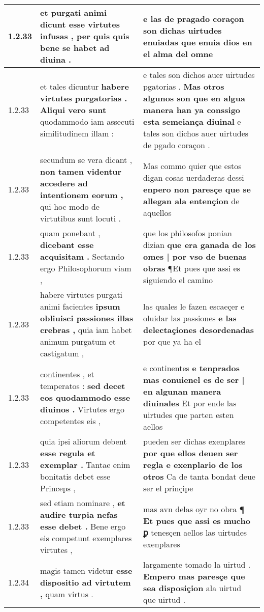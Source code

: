 \begin{tabular}{|p{1cm}|p{6.5cm}|p{6.5cm}|}
1.2.33 & et purgati animi dicunt \textbf{ esse virtutes infusas , } per quis quis bene se habet ad diuina . & e las de pragado coraçon \textbf{ son dichas uirtudes enuiadas } que enuia dios en el alma del omne \\\hline
1.2.33 & et tales dicuntur \textbf{ habere virtutes purgatorias . Aliqui vero sunt } quodammodo iam assecuti similitudinem illam : & e tales son dichos auer uirtudes pgatorias . \textbf{ Mas otros algunos son que en algua manera han ya conssigo esta semeiança diuinal } e tales son dichos auer uirtudes de pgado coraçon . \\\hline
1.2.33 & secundum se vera dicant , \textbf{ non tamen videntur accedere ad intentionem eorum , } qui hoc modo de virtutibus sunt locuti . & Mas commo quier que estos digan cosas uerdaderas dessi \textbf{ enpero non paresçe que se allegan ala entençion } de aquellos \\\hline
1.2.33 & quam ponebant , \textbf{ dicebant esse acquisitam . } Sectando ergo Philosophorum viam , & que los philosofos ponian dizian \textbf{ que era ganada de los omes | por vso de buenas obras } ¶Et pues que assi es siguiendo el camino \\\hline
1.2.33 & habere virtutes purgati animi facientes \textbf{ ipsum obliuisci passiones illas crebras , } quia iam habet animum purgatum et castigatum , & las quales le fazen escaeçer e oluidar las passiones \textbf{ e las delectaçiones desordenadas } por que ya ha el \\\hline
1.2.33 & continentes , et temperatos : \textbf{ sed decet eos quodammodo esse diuinos . } Virtutes ergo competentes eis , & e continentes \textbf{ e tenprados mas conuienel es de ser | en algunan manera diuinales } Et por ende las uirtudes que parten esten aellos \\\hline
1.2.33 & quia ipsi aliorum debent \textbf{ esse regula et exemplar . } Tantae enim bonitatis debet esse Princeps , & pueden ser dichas exenplares \textbf{ por que ellos deuen ser regla e exenplario de los otros } Ca de tanta bondat deue ser el prinçipe \\\hline
1.2.33 & sed etiam nominare , \textbf{ et audire turpia nefas esse debet . } Bene ergo eis competunt exemplares virtutes , & mas avn delas oyr no obra ¶ \textbf{ Et pues que assi es mucho ꝑ } tenesçen aellos las uirtudes exenplares \\\hline
1.2.34 & magis tamen videtur \textbf{ esse dispositio ad virtutem , } quam virtus . & largamente tomado la uirtud . \textbf{ Empero mas paresçe que sea disposiçion } ala uirtud que uirtud . \\\hline

\end{tabular}
